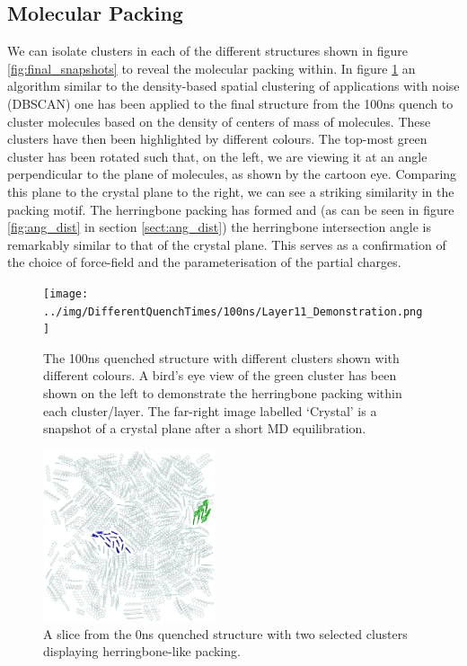 \subsection{Molecular Packing}
\noindent We can isolate clusters in each of the different structures shown in figure \ref{fig:final_snapshots} to reveal the molecular packing within. In figure \ref{fig:Layer11} an algorithm similar to the density-based spatial clustering of applications with noise (DBSCAN) one \cite{DBSCAN} has been applied to the final structure from the 100ns quench to cluster molecules based on the density of centers of mass of molecules. These clusters have then been highlighted by different colours. The top-most green cluster has been rotated such that, on the left, we are viewing it at an angle perpendicular to the plane of molecules, as shown by the cartoon eye. Comparing this plane to the crystal plane to the right, we can see a striking similarity in the packing motif. The herringbone packing has formed and (as can be seen in figure \ref{fig:ang_dist} in section \ref{sect:ang_dist}) the herringbone intersection angle is remarkably similar to that of the crystal plane. This serves as a confirmation of the choice of force-field and the parameterisation of the partial charges.
\begin{figure}[ht]
	\texttt{[image: ../img/DifferentQuenchTimes/100ns/Layer11\_Demonstration.png]}
	\caption{\label{fig:Layer11}The 100ns quenched structure with different clusters shown with different colours. A bird's eye view of the green cluster has been shown on the left to demonstrate the herringbone packing within each cluster/layer. The far-right image labelled `Crystal' is a snapshot of a crystal plane after a short MD equilibration.}
\end{figure}
\begin{figure}
\vspace*{-0.8cm}
	\centering
	\includegraphics[width=0.45\textwidth]{../img/DifferentQuenchTimes/0ns/Slice6_4Clusters.png}
	\caption{\label{fig:ClustInst}A slice from the 0ns quenched structure with two selected clusters displaying herringbone-like packing.}
\end{figure}

